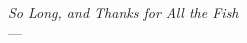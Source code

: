 \label{ch:discussion}
\begin{flushright}{\slshape    
		So Long, and Thanks for All the Fish} \\ \medskip
    ---  \citep{Adams1984}
\end{flushright}
\bigskip

\lipsum[1]

